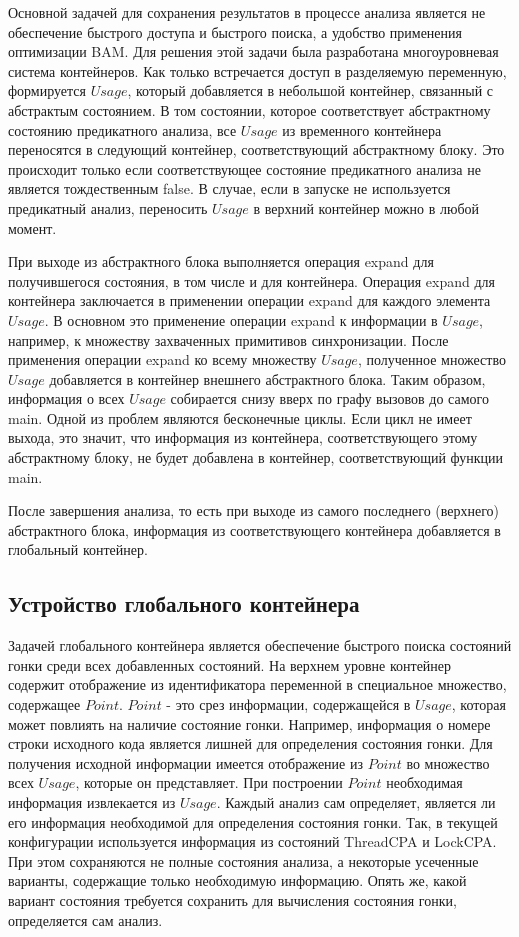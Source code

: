 Основной задачей для сохранения результатов в процессе анализа является не обеспечение быстрого доступа и быстрого поиска, а удобство применения оптимизации BAM. 
Для решения этой задачи была разработана многоуровневая система контейнеров. 
Как только встречается доступ в разделяемую переменную, формируется $Usage$, который добавляется в небольшой контейнер, связанный с абстрактым состоянием. 
В том состоянии, которое соответствует абстрактному состоянию предикатного анализа, все $Usage$ из временного контейнера переносятся в следующий контейнер, соответствующий абстрактному блоку. Это происходит только если соответствующее состояние предикатного анализа не является тождественным false. В случае, если в запуске не используется предикатный анализ, переносить $Usage$ в верхний контейнер можно в любой момент.

При выходе из абстрактного блока выполняется операция expand для получившегося состояния, в том числе и для контейнера.
Операция expand для контейнера заключается в применении операции expand для каждого элемента $Usage$.
В основном это применение операции expand к информации в $Usage$, например, к множеству захваченных примитивов синхронизации. 
После применения операции expand ко всему множеству $Usage$, полученное множество $Usage$ добавляется в контейнер внешнего абстрактного блока.
Таким образом, информация о всех $Usage$ собирается снизу вверх по графу вызовов до самого main. 
Одной из проблем являются бесконечные циклы. Если цикл не имеет выхода, это значит, что информация из контейнера, соответствующего этому абстрактному блоку, не будет добавлена в контейнер, соответствующий функции main.

После завершения анализа, то есть при выходе из самого последнего (верхнего) абстрактного блока, информация из соответствующего контейнера добавляется в глобальный контейнер.

\subsection{Устройство глобального контейнера} \label{subsect_impl_global_storage}

Задачей глобального контейнера является обеспечение быстрого поиска состояний гонки среди всех добавленных состояний. 
На верхнем уровне контейнер содержит отображение из идентификатора переменной в специальное множество, содержащее $Point$. $Point$ - это срез информации, содержащейся в $Usage$, которая может повлиять на наличие состояние гонки.
Например, информация о номере строки исходного кода является лишней для определения состояния гонки. 
Для получения исходной информации имеется отображение из $Point$ во множество всех $Usage$, которые он представляет.
При построении $Point$ необходимая информация извлекается из $Usage$.
Каждый анализ сам определяет, является ли его информация необходимой для определения состояния гонки. 
Так, в текущей конфигурации используется информация из состояний ThreadCPA и LockCPA. 
При этом сохраняются не полные состояния анализа, а некоторые усеченные варианты, содержащие только необходимую информацию. 
Опять же, какой вариант состояния требуется сохранить для вычисления состояния гонки, определяется сам анализ.

